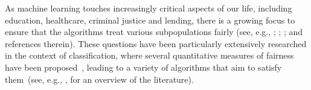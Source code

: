 \documentclass{article}
\begin{document}
As machine learning touches increasingly critical aspects of our life, including education, healthcare, criminal justice and lending, there is a growing focus to ensure that the algorithms treat various subpopulations fairly (see, e.g., \citealp{barocas16big}; \citealp{podesta2014big}; \citealp{CorbettDaviesGo18}; and references therein). These questions have been particularly extensively researched in the context of classification, where several quantitative measures of fairness have been proposed~\citep{berk,chouldechova,hardt16,kleinberg2017inherent}, leading to a variety of algorithms that aim
to satisfy them~(see, e.g., \citealp{CorbettDaviesGo18}, for an overview of the literature).

\end{document}
